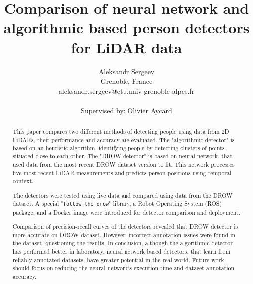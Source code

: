 \documentclass{article}
\title{
    Comparison of neural network and algorithmic based person detectors for LiDAR data
}
\author{
    Aleksandr Sergeev \\ 
    Grenoble, France \\
    aleksandr.sergeev@etu.univ-grenoble-alpes.fr \\
    \\
    Supervised by: Olivier Aycard
}
\begin{document}
\graphicspath{{images}}


\parbox[b]{\linewidth}{}

\begin{abstract}
    This paper compares two different methods of detecting people using data from 2D LiDARs, their performance and accuracy are evaluated.
    The "algorithmic detector" is based on an heuristic algorithm, identifying people by detecting clusters of points situated close to each other.
    The "DROW detector" is based on neural network, that used data from the most recent DROW dataset version to fit.
    This network processes five most recent LiDAR measurements and predicts person positions using temporal context.

    The detectors were tested using live data and compared using data from the DROW dataset.
    A special "\texttt{follow\_the\_drow}" library, a Robot Operating System (ROS) package, and a Docker image were introduced for detector comparison and deployment.

    Comparison of precision-recall curves of the detectors revealed that DROW detector is more accurate on DROW dataset.
    However, incorrect annotation issues were found in the dataset, questioning the results.
    In conclusion, although the algorithmic detector has performed better in laboratory, neural network based detectors, that learn from reliably annotated datasets, have greater potential in the real world.
    Future work should focus on reducing the neural network's execution time and dataset annotation accuracy.
\end{abstract}
\end{document}
